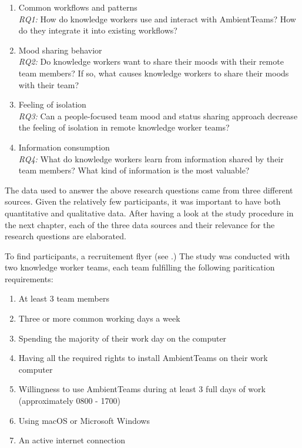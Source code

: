 \begin{enumerate}
    \item Common workflows and patterns \\
          \textit{RQ1:} How do knowledge workers use and interact with AmbientTeams? How do they integrate it into existing workflows?
    \item Mood sharing behavior \\
          \textit{RQ2:} Do knowledge workers want to share their moods with their remote team members? If so, what causes knowledge workers to share their moods with their team?
    \item Feeling of isolation \\
          \textit{RQ3:} Can a people-focused team mood and status sharing approach decrease the feeling of isolation in remote knowledge worker teams?
    \item Information consumption \\
          \textit{RQ4:} What do knowledge workers learn from information shared by their team members? What kind of information is the most valuable?
\end{enumerate}

The data used to answer the above research questions came from three different sources. Given the relatively few participants, it was important to have both quantitative and qualitative data. After having a look at the study procedure in the next chapter, each of the three data sources and their relevance for the research questions are elaborated.

To find participants, a recruitement flyer (see .) The study was conducted with two knowledge worker teams, each team fulfilling the following paritication requirements:

\begin{enumerate}
    \item At least 3 team members
    \item Three or more common working days a week
    \item Spending the majority of their work day on the computer
    \item Having all the required rights to install AmbientTeams on their work computer
    \item Willingness to use AmbientTeams during at least 3 full days of work (approximately 0800 - 1700)
    \item Using macOS or Microsoft Windows
    \item An active internet connection
\end{enumerate}

